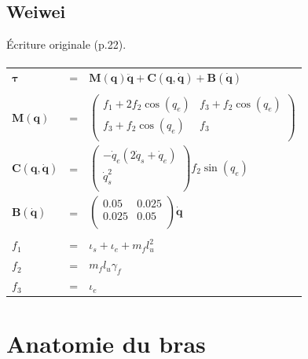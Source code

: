 \documentclass[pdftex,a4paper,11pt]{report}
\newcommand{\vs}[1]{\boldsymbol{#1}} %
\newcommand{\ms}[1]{\boldsymbol{#1}} %
\numberwithin{equation}{subsection}
\begin{document}

\subsection{Weiwei}
Écriture originale \cite{li2006} (p.22).

\paragraph{}
\begin{tabular}{lcl}
    $\vs{\tau}$ & = & $\ms{M}(\vs{q})\vs{\ddot{q}} + \vs{C}(\vs{q}, \vs{\dot{q}}) + \vs{B}(\vs{\dot{q}})$ \\
    \\

    $\ms{M}(\vs{q})$ & = &
    $
    \begin{pmatrix}
        f_1 + 2 f_2 \cos(q_e)  & f_3 + f_2 \cos(q_e) \\
        f_3 + f_2 \cos(q_e) & f_3 \\
    \end{pmatrix}
    $ \\

    $\vs{C}(\vs{q}, \vs{\dot{q}})$ & = &
    $
    \begin{pmatrix}
        -\dot{q}_e (2 \dot{q}_s + \dot{q}_e) \\
        \dot{q}_s^2 \\
    \end{pmatrix}
    f_2 \sin(q_e)
    $\\

    $\vs{B}(\vs{\dot{q}})$ & = &
    $
    \begin{pmatrix}
        0.05  & 0.025 \\
        0.025 & 0.05 \\
    \end{pmatrix}
    \vs{\dot{q}}
    $ \\
    \\

    $f_1$ & = & $\iota_s + \iota_e + m_f l_u^2$ \\
    $f_2$ & = & $m_f l_u \gamma_f$ \\
    $f_3$ & = & $\iota_e$ \\
\end{tabular}


\section{Anatomie du bras}
\end{document}
